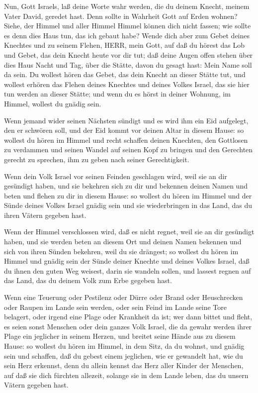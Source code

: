  Nun, Gott Israels, laß deine Worte wahr werden, die du
deinem Knecht, meinem Vater David, geredet hast.  Denn
sollte in Wahrheit Gott auf Erden wohnen? Siehe, der Himmel und aller
Himmel Himmel können dich nicht fassen; wie sollte es denn dies Haus
tun, das ich gebaut habe?  Wende dich aber zum Gebet deines
Knechtes und zu seinem Flehen, HERR, mein Gott, auf daß du hörest das
Lob und Gebet, das dein Knecht heute vor dir tut;  daß
deine Augen offen stehen über dies Haus Nacht und Tag, über die Stätte,
davon du gesagt hast: Mein Name soll da sein. Du wollest hören das
Gebet, das dein Knecht an dieser Stätte tut,  und wollest
erhören das Flehen deines Knechtes und deines Volkes Israel, das sie
hier tun werden an dieser Stätte; und wenn du es hörst in deiner
Wohnung, im Himmel, wollest du gnädig sein.

 Wenn jemand wider seinen Nächsten sündigt und es wird ihm
ein Eid aufgelegt, den er schwören soll, und der Eid kommt vor deinen
Altar in diesem Hause:  so wollest du hören im Himmel und
recht schaffen deinen Knechten, den Gottlosen zu verdammen und seinen
Wandel auf seinen Kopf zu bringen und den Gerechten gerecht zu sprechen,
ihm zu geben nach seiner Gerechtigkeit.

 Wenn dein Volk Israel vor seinen Feinden geschlagen wird,
weil sie an dir gesündigt haben, und sie bekehren sich zu dir und
bekennen deinen Namen und beten und flehen zu dir in diesem Hause:
 so wollest du hören im Himmel und der Sünde deines Volkes
Israel gnädig sein und sie wiederbringen in das Land, das du ihren
Vätern gegeben hast.

 Wenn der Himmel verschlossen wird, daß es nicht regnet,
weil sie an dir gesündigt haben, und sie werden beten an diesem Ort und
deinen Namen bekennen und sich von ihren Sünden bekehren, weil du sie
drängest;  so wollest du hören im Himmel und gnädig sein
der Sünde deiner Knechte und deines Volkes Israel, daß du ihnen den
guten Weg weisest, darin sie wandeln sollen, und lassest regnen auf das
Land, das du deinem Volk zum Erbe gegeben hast.

 Wenn eine Teuerung oder Pestilenz oder Dürre oder Brand
oder Heuschrecken oder Raupen im Lande sein werden, oder sein Feind im
Lande seine Tore belagert, oder irgend eine Plage oder Krankheit da ist;
 wer dann bittet und fleht, es seien sonst Menschen oder
dein ganzes Volk Israel, die da gewahr werden ihrer Plage ein jeglicher
in seinem Herzen, und breitet seine Hände aus zu diesem Hause:
 so wollest du hören im Himmel, in dem Sitz, da du wohnst,
und gnädig sein und schaffen, daß du gebest einem jeglichen, wie er
gewandelt hat, wie du sein Herz erkennst, denn du allein kennst das Herz
aller Kinder der Menschen,  auf daß sie dich fürchten
allezeit, solange sie in dem Lande leben, das du unsern Vätern gegeben
hast.

